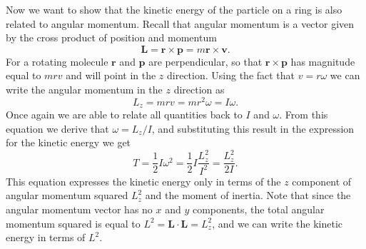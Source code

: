 \documentclass[../Main/chem331-notes.tex]{subfiles}
\begin{document}
Now we want to show that the kinetic energy of the particle on a ring is also related to angular momentum.
Recall that angular momentum is a vector given by the cross product of position and momentum
\begin{equation}
\mathbf{L} = \mathbf{r} \times \mathbf{p}   = m  \mathbf{r} \times \mathbf{v}.
\end{equation}
For a rotating molecule $\mathbf{r}$ and $\mathbf{p}$ are perpendicular, so that $\mathbf{r} \times \mathbf{p}$ has magnitude equal to $m r v$ and will point in the $z$ direction.
Using the fact that $v = r \omega$ we can write the angular momentum in the $z$ direction as
\begin{equation}
L_z = mrv = m r^2 \omega = I \omega.
\end{equation}
Once again we are able to relate all quantities back to $I$ and $\omega$.
From this equation we derive that $\omega = L_z / I$, and substituting this result in the expression for the kinetic energy we get
\begin{equation}
T = \frac{1}{2} I \omega^2 = \frac{1}{2} I \frac{L_z^2}{I^2} = \frac{L_z^2}{2 I}.
\end{equation}
This equation expresses the kinetic energy only in terms of the $z$ component of angular momentum squared $L_z^2$ and the moment of inertia.
Note that since the angular momentum vector has no $x$ and $y$ components, the total angular momentum squared is equal to $L^2 = \mathbf{L} \cdot \mathbf{L} = L_z^2$, and we can write the kinetic energy in terms of $L^2$. 
\end{document}
